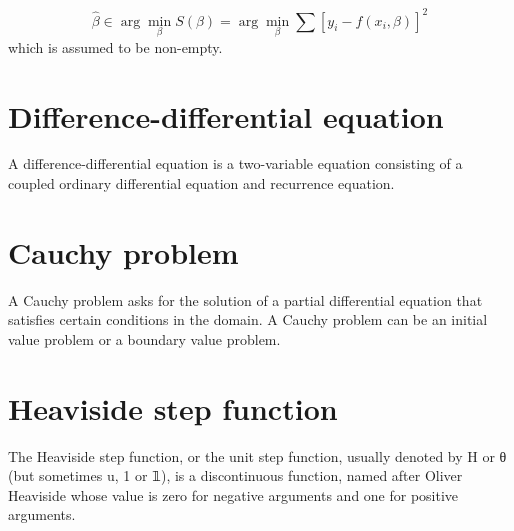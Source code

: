  	$$ \hat{\beta} \in \arg \min_{\beta} S(\beta)= \arg \min_{\beta} \sum [y_{i}-f(x_{i},\beta)]^{2} $$
 which is assumed to be non-empty.
 
 \section*{Difference-differential equation }
 \par A difference-differential equation is a two-variable equation consisting of a coupled ordinary differential equation and recurrence equation.
 
 \section*{Cauchy problem} 
 \par A Cauchy problem asks for the solution of a partial differential equation that satisfies certain conditions in the domain. A Cauchy problem can be an initial value problem or a boundary value problem.
 




\section*{Heaviside step function}

\par The Heaviside step function, or the unit step function, usually denoted by H or θ (but sometimes u, 1 or 𝟙), is a discontinuous function, named after Oliver Heaviside whose value is zero for negative arguments and one for positive arguments.



